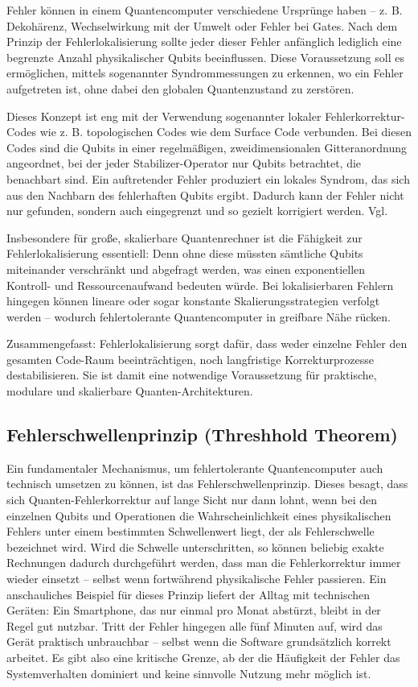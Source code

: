 Fehler können in einem Quantencomputer verschiedene Ursprünge haben – z. B. Dekohärenz, Wechselwirkung mit der Umwelt oder Fehler bei Gates. Nach dem Prinzip der Fehlerlokalisierung sollte jeder dieser Fehler anfänglich lediglich eine begrenzte Anzahl physikalischer Qubits beeinflussen. Diese Voraussetzung soll es ermöglichen, mittels sogenannter Syndrommessungen zu erkennen, wo ein Fehler aufgetreten ist, ohne dabei den globalen Quantenzustand zu zerstören.

Dieses Konzept ist eng mit der Verwendung sogenannter lokaler Fehlerkorrektur-Codes wie z. B. topologischen Codes wie dem Surface Code verbunden. Bei diesen Codes sind die Qubits in einer regelmäßigen, zweidimensionalen Gitteranordnung angeordnet, bei der jeder Stabilizer-Operator nur Qubits betrachtet, die benachbart sind. Ein auftretender Fehler produziert ein lokales Syndrom, das sich aus den Nachbarn des fehlerhaften Qubits ergibt. Dadurch kann der Fehler nicht nur gefunden, sondern auch eingegrenzt und so gezielt korrigiert werden. Vgl. \cite{fowler_surface_2012}

Insbesondere für große, skalierbare Quantenrechner ist die Fähigkeit zur Fehlerlokalisierung essentiell: Denn ohne diese müssten sämtliche Qubits miteinander verschränkt und abgefragt werden, was einen exponentiellen Kontroll- und Ressourcenaufwand bedeuten würde. Bei lokalisierbaren Fehlern hingegen können lineare oder sogar konstante Skalierungsstrategien verfolgt werden – wodurch fehlertolerante Quantencomputer in greifbare Nähe rücken.

Zusammengefasst: Fehlerlokalisierung sorgt dafür, dass weder einzelne Fehler den gesamten Code-Raum beeinträchtigen, noch langfristige Korrekturprozesse destabilisieren. Sie ist damit eine notwendige Voraussetzung für praktische, modulare und skalierbare Quanten-Architekturen.

\subsection{Fehlerschwellenprinzip (Threshhold Theorem)}
Ein fundamentaler Mechanismus, um fehlertolerante Quantencomputer auch technisch umsetzen zu können, ist das Fehlerschwellenprinzip. Dieses besagt, dass sich Quanten-Fehlerkorrektur auf lange Sicht nur dann lohnt, wenn bei den einzelnen Qubits und Operationen die Wahrscheinlichkeit eines physikalischen Fehlers unter einem bestimmten Schwellenwert liegt, der als Fehlerschwelle bezeichnet wird. Wird die Schwelle unterschritten, so können beliebig exakte Rechnungen dadurch durchgeführt werden, dass man die Fehlerkorrektur immer wieder einsetzt – selbst wenn fortwährend physikalische Fehler passieren. Ein anschauliches Beispiel für dieses Prinzip liefert der Alltag mit technischen Geräten: Ein Smartphone, das nur einmal pro Monat abstürzt, bleibt in der Regel gut nutzbar. Tritt der Fehler hingegen alle fünf Minuten auf, wird das Gerät praktisch unbrauchbar – selbst wenn die Software grundsätzlich korrekt arbeitet. Es gibt also eine kritische Grenze, ab der die Häufigkeit der Fehler das Systemverhalten dominiert und keine sinnvolle Nutzung mehr möglich ist.\cite[Seite 454-456]{nielsen_quantum_2010}

